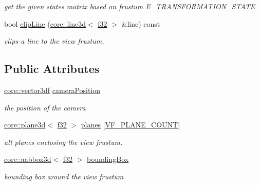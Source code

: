 \begin{DoxyCompactItemize}
\begin{DoxyCompactList}\small\item\em get the given state\textquotesingle{}s matrix based on frustum E\+\_\+\+T\+R\+A\+N\+S\+F\+O\+R\+M\+A\+T\+I\+O\+N\+\_\+\+S\+T\+A\+TE \end{DoxyCompactList}\item 
bool \hyperlink{structirr_1_1scene_1_1SViewFrustum_a8d4a42afc55dde3b193ad0b1311f9dfe}{clip\+Line} (\hyperlink{classirr_1_1core_1_1line3d}{core\+::line3d}$<$ \hyperlink{namespaceirr_a0277be98d67dc26ff93b1a6a1d086b07}{f32} $>$ \&line) const
\begin{DoxyCompactList}\small\item\em clips a line to the view frustum. \end{DoxyCompactList}\end{DoxyCompactItemize}
\subsection*{Public Attributes}
\begin{DoxyCompactItemize}
\item 
\mbox{\label{structirr_1_1scene_1_1SViewFrustum_a77726fa084f416d69f058a7b2f887545}} 
\hyperlink{namespaceirr_1_1core_a06f169d08b5c429f5575acb7edbad811}{core\+::vector3df} \hyperlink{structirr_1_1scene_1_1SViewFrustum_a77726fa084f416d69f058a7b2f887545}{camera\+Position}
\begin{DoxyCompactList}\small\item\em the position of the camera \end{DoxyCompactList}\item 
\mbox{\label{structirr_1_1scene_1_1SViewFrustum_afa59258f22c23b6f1dc4bcaff142dba2}} 
\hyperlink{classirr_1_1core_1_1plane3d}{core\+::plane3d}$<$ \hyperlink{namespaceirr_a0277be98d67dc26ff93b1a6a1d086b07}{f32} $>$ \hyperlink{structirr_1_1scene_1_1SViewFrustum_afa59258f22c23b6f1dc4bcaff142dba2}{planes} \mbox{[}\hyperlink{structirr_1_1scene_1_1SViewFrustum_ae3a96797aec028717f0589e82926b9f0a6c3c4cb8060a23a2365cf1df46fcefd7}{V\+F\+\_\+\+P\+L\+A\+N\+E\+\_\+\+C\+O\+U\+NT}\mbox{]}
\begin{DoxyCompactList}\small\item\em all planes enclosing the view frustum. \end{DoxyCompactList}\item 
\mbox{\label{structirr_1_1scene_1_1SViewFrustum_ad4c8605ad3494093e3e5860e0332fe8a}} 
\hyperlink{classirr_1_1core_1_1aabbox3d}{core\+::aabbox3d}$<$ \hyperlink{namespaceirr_a0277be98d67dc26ff93b1a6a1d086b07}{f32} $>$ \hyperlink{structirr_1_1scene_1_1SViewFrustum_ad4c8605ad3494093e3e5860e0332fe8a}{bounding\+Box}
\begin{DoxyCompactList}\small\item\em bounding box around the view frustum \end{DoxyCompactList}\end{DoxyCompactItemize}


